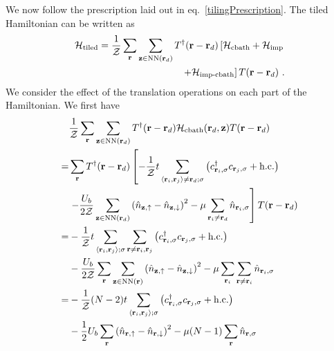 \documentclass[reprint,hidelinks]{revtex4-2}
\begin{document}
We now follow the prescription laid out in eq.~\ref{tilingPrescription}. The tiled Hamiltonian can be written as 
\begin{equation}\begin{aligned}
	\mathcal{H}_\text{tiled} = \frac{1}{\mathcal{Z}}\sum_{{\bf r}}\sum_{{\bf z}\in\text{NN}({\bf r}_d)}T^\dagger({\bf r} - {\bf r}_d)\left[\mathcal{H}_\text{cbath} + \mathcal{H}_\text{imp} \right.\\
\left.+ \mathcal{H}_\text{imp-cbath}\right]T({\bf r} - {\bf r}_d)~.
\end{aligned}\end{equation}
We consider the effect of the translation operations on each part of the Hamiltonian. We first have
\begin{equation}\begin{aligned}
	&\frac{1}{\mathcal{Z}}\sum_{{\bf r}}\sum_{{\bf z}\in\text{NN}({\bf r}_d)}T^\dagger({\bf r} - {\bf r}_d)\mathcal{H}_\text{cbath}({\bf r}_d, {\bf z})T({\bf r} - {\bf r}_d) \\
	=& \sum_{{\bf r}}T^\dagger({\bf r} - {\bf r}_d)\left[-\frac{1}{\mathcal{Z}}t\sum_{\left<{\bf r}_i, {\bf r}_j\right>\neq{\bf r}_d;\sigma}\left(c^\dagger_{{\bf r}_i,\sigma}c_{{\bf r}_j,\sigma} + \text{h.c.}\right) \right.\\
	 &\left.- \frac{U_b}{2\mathcal{Z}}\sum_{{\bf z}\in\text{NN}({\bf r}_d)}\left(\hat n_{{\bf z}, \uparrow} - \hat n_{{\bf z}, \downarrow}\right)^2 - \mu \sum_{{\bf r}_i \neq {\bf r}_d}\hat n_{{\bf r}_i,\sigma}\right]T({\bf r} - {\bf r}_d) \\
	=& -\frac{1}{\mathcal{Z}}t\sum_{\left<{\bf r}_i, {\bf r}_j\right>;\sigma}\sum_{{\bf r}\neq{\bf r}_i,{\bf r}_j}\left(c^\dagger_{{\bf r}_i,\sigma}c_{{\bf r}_j,\sigma} + \text{h.c.}\right) \\
	 &- \frac{U_b}{2\mathcal{Z}}\sum_{\bf r}\sum_{{\bf z}\in\text{NN}\left({\bf r}\right)}\left(\hat n_{{\bf z}, \uparrow} - \hat n_{{\bf z}, \downarrow}\right)^2 - \mu \sum_{{\bf r}_i}\sum_{{\bf r} \neq {\bf r}_i}\hat n_{{\bf r}_i,\sigma}\\
	=& -\frac{1}{\mathcal{Z}}(N-2)t\sum_{\left<{\bf r}_i, {\bf r}_j\right>;\sigma}\left(c^\dagger_{{\bf r}_i,\sigma}c_{{\bf r}_j,\sigma} + \text{h.c.}\right)\\
	 &- \frac{1}{2}U_b\sum_{\bf r}\left(\hat n_{{\bf r} , \uparrow} - \hat n_{{\bf r} , \downarrow}\right)^2 - \mu (N-1) \sum_{{\bf r}}\hat n_{{\bf r},\sigma}\\
\end{aligned}\end{equation}
\end{document}
